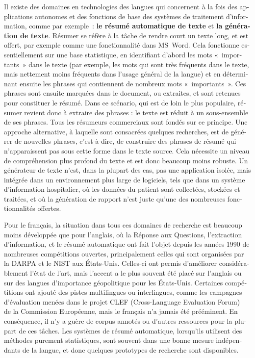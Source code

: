 \begin{french}
\begin{multicols}{2}
Il existe des domaines en technologies des langues qui concernent à la fois des applications autonomes et des fonctions de base des systèmes de traitement d'information, comme par exemple~: {\bf le résumé automatique de texte} et {\bf la génération de texte}. Résumer se réfère à la tâche de
rendre court un texte long, et est offert, par exemple comme une
fonctionnalité dans MS~Word. Cela fonctionne essentiellement sur une
base statistique, en identifiant d'abord les mots
«~importants~» dans le texte (par exemple, les mots qui sont très
fréquents dans le texte, mais nettement moins fréquents dans l'usage général de la langue) et en déterminant ensuite les phrases
qui contiennent de nombreux mots «~importants~». Ces phrases sont
ensuite marquées dans le document, ou extraites, et sont retenues pour
constituer le résumé. Dans ce scénario, qui est de loin le plus
populaire, résumer revient donc à extraire des phrases : le texte est
réduit à un sous-ensemble de ses phrases. Tous les résumeurs
commerciaux sont fondés sur ce principe. Une approche alternative, à laquelle
sont consacrées quelques recherches, est de générer de nouvelles
phrases, c'est-à-dire, de construire des phrases de résumé qui
n'apparaissent pas sous cette forme dans le texte source. Cela
nécessite un niveau de compréhension plus profond du texte et est donc
beaucoup moins robuste. Un générateur de texte n'est, dans la
plupart des cas, pas une application isolée, mais intégrée dans un
environnement plus large de logiciels, tels que dans un système
d'information hospitalier, où les données du patient sont
collectées, stockées et traitées, et où la génération de rapport
n'est juste qu'une des nombreuses fonctionnalités
offertes.

Pour le français, la situation dans tous ces domaines de recherche est
beaucoup moins développée que pour l'anglais, où la Réponse aux
Questions, l'extraction d'information, et le résumé automatique ont
fait l'objet depuis les années 1990 de nombreuses compétitions
ouvertes, principalement celles qui sont organisées par la DARPA et le
NIST aux États-Unis. Celles-ci ont permis d'améliorer considérablement
l'état de l'art, mais l'accent a le plus souvent été placé sur
l'anglais ou sur des langues d'importance géopolitique pour les
États-Unis. Certaines compétitions ont ajouté des pistes multilingues
ou interlingues, comme les campagnes d'évaluation menées dans le
projet CLEF (Cross-Language Evaluation Forum)~\cite{clef} de la
Commission Européenne, mais le français n'a jamais été prééminent. En
conséquence, il n'y a guère de corpus annotés ou d'autres ressources
pour la plupart de ces tâches. Les systèmes de résumé automatique,
lorsqu'ils utilisent des méthodes purement statistiques, sont souvent
dans une bonne mesure indépendants de la langue, et donc quelques
prototypes de recherche sont disponibles.


\end{multicols}
\end{french}
